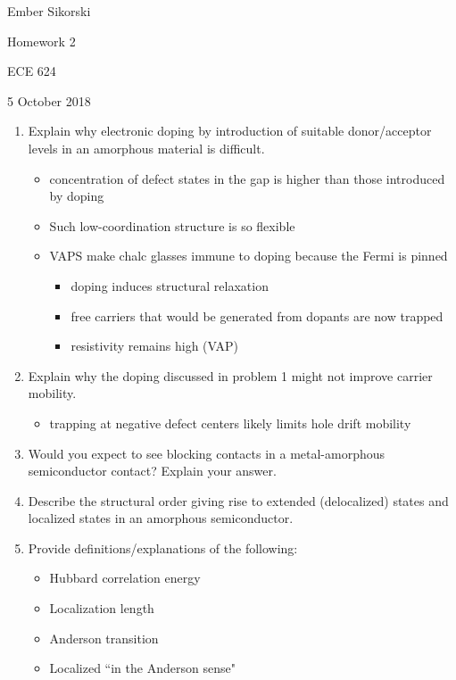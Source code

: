 \documentclass[12pt]{elsarticle}
\newcommand{\vs}{\vspace{2mm}}
\begin{document}
\begin{flushright}
	Ember Sikorski\par
	Homework 2\par
	ECE 624\par 
	5 October 2018
\end{flushright}


\begin{enumerate}
\item Explain why electronic doping by introduction of suitable donor/acceptor levels in an amorphous material is difficult.
\begin{itemize}
	\item \cite{Tauc1976} concentration of defect states in the gap is higher than those introduced by doping
	\item \cite{Kim2015}  Such low-coordination structure is so flexible 
	\item \cite{Fritzsche2007} VAPS make chalc glasses immune to doping because the Fermi is pinned
	\begin{itemize}
		\item doping induces structural relaxation
		\item free carriers that would be generated from dopants are now trapped
		\item resistivity remains high (VAP)
	\end{itemize}
\end{itemize}

\item Explain why the doping discussed in problem 1 might not improve carrier mobility. \par \vs
\begin{itemize}
	\item \cite{Kazakova1999} trapping at negative defect centers likely limits hole drift mobility
\end{itemize}
\item Would you expect to see blocking contacts in a metal-amorphous semiconductor contact? Explain your answer.

\item Describe the structural order giving rise to extended (delocalized) states and localized states in an amorphous semiconductor.

\item Provide definitions/explanations of the following:
\begin{itemize}
	\item Hubbard correlation energy
	\item Localization length
	\item Anderson transition
	\item Localized ``in the Anderson sense"
\end{itemize}


\end{enumerate}
\end{document}
